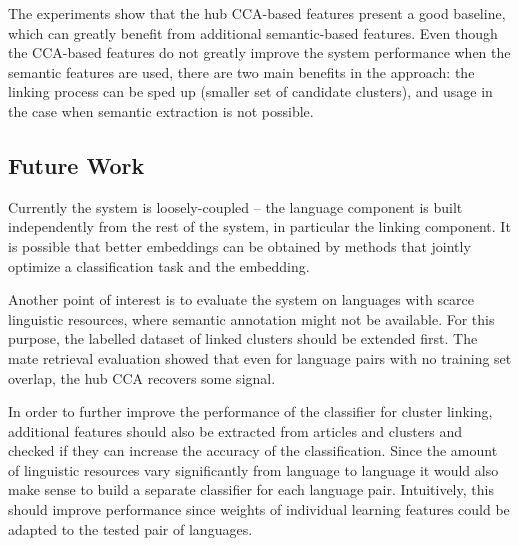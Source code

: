 \documentclass[twoside,11pt]{article}
\begin{document}
The experiments show that the hub CCA-based features present a good baseline, which can greatly benefit from additional semantic-based features. Even though the CCA-based features do not greatly improve the system performance when the semantic features are used, there are two main benefits in the approach: the linking process can be sped up (smaller set of candidate clusters), and usage in the case when semantic extraction is not possible.

\subsection{Future Work}

Currently the system is loosely-coupled -- the language component is built independently from the rest of the system, in particular the linking component. It is possible that better embeddings can be obtained by methods that jointly optimize a classification task and the embedding.
		
Another point of interest is to evaluate the system on languages with scarce linguistic resources, where semantic annotation might not be available. For this purpose, the labelled dataset of linked clusters should be extended first. The mate retrieval evaluation showed that even for language pairs with no training set overlap, the hub CCA recovers some signal.

In order to further improve the performance of the classifier for cluster linking, additional features should also be extracted from articles and clusters and checked if they can increase the accuracy of the classification. Since the amount of linguistic resources vary significantly from language to language it would also make sense to build a separate classifier for each language pair. Intuitively, this should improve performance since weights of individual learning features could be adapted to the tested pair of languages.


\vskip 0.2in


\end{document}
